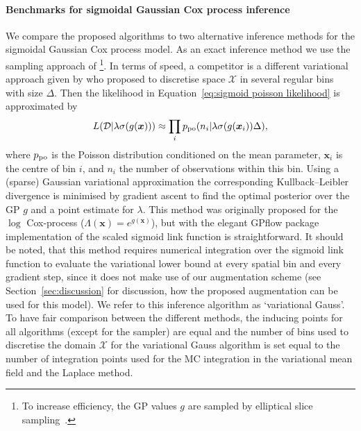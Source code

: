 \documentclass[twoside,11pt]{article}
\newcommand{\dataset}{{\cal D}}
\newcommand{\bx}{\boldsymbol{x}}
\newcommand{\Po}{p_\mathrm{{\tiny po}}}
\newcommand{\X}{\mathcal{X}}
\begin{document}
\paragraph{Benchmarks for sigmoidal Gaussian Cox process inference} We compare the proposed algorithms to two alternative inference methods for the sigmoidal Gaussian Cox process model. As an exact inference method we use the sampling approach of \citet{adams2009tractable}\footnote{To increase efficiency, the GP values $g$ are sampled by elliptical slice sampling~\citep{murray2010elliptical}.}. In terms of speed, a competitor is a different variational approach given by \citet{hensman2015mcmc} who proposed to discretise space $\X$ in several regular bins with size $\Delta$. Then the likelihood in Equation~\eqref{eq:sigmoid poisson likelihood} is approximated by
\begin{equation}
L(\dataset\vert \lambda\sigma(g(\bx))) \approx \prod_{i}\Po(n_i\vert \lambda\sigma(g(\bx_i))\Delta),
\end{equation}
where $\Po$ is the Poisson distribution conditioned on the mean parameter, $\bx_i$ is the centre of bin $i$, and $n_i$ the number of observations within this bin. 
Using a (sparse) Gaussian variational approximation the corresponding Kullback--Leibler divergence is minimised by gradient ascent to find the optimal posterior over the GP $g$ and a point estimate for $\lambda$. This method was originally proposed for the $\log$ Cox-process ($\Lambda(\bx)=e^{g(\bx)}$), but with the elegant GPflow package \citep{GPflow2017} implementation of the scaled sigmoid link function is straightforward. It should be noted, that this method requires numerical integration over the sigmoid link function to evaluate the variational lower bound at every spatial bin and every gradient step, since it does not make use of our augmentation scheme (see Section~\ref{sec:discussion} for discussion, how the proposed augmentation can be used for this model). We refer to this inference algorithm as `variational Gauss'. To have fair comparison between the different methods, the inducing points for all algorithms (except for the sampler) are equal and the number of bins used to discretise the domain $\X$ for the variational Gauss algorithm is set equal to the number of integration points used for the MC integration in the variational mean field and the Laplace method.
\end{document}
